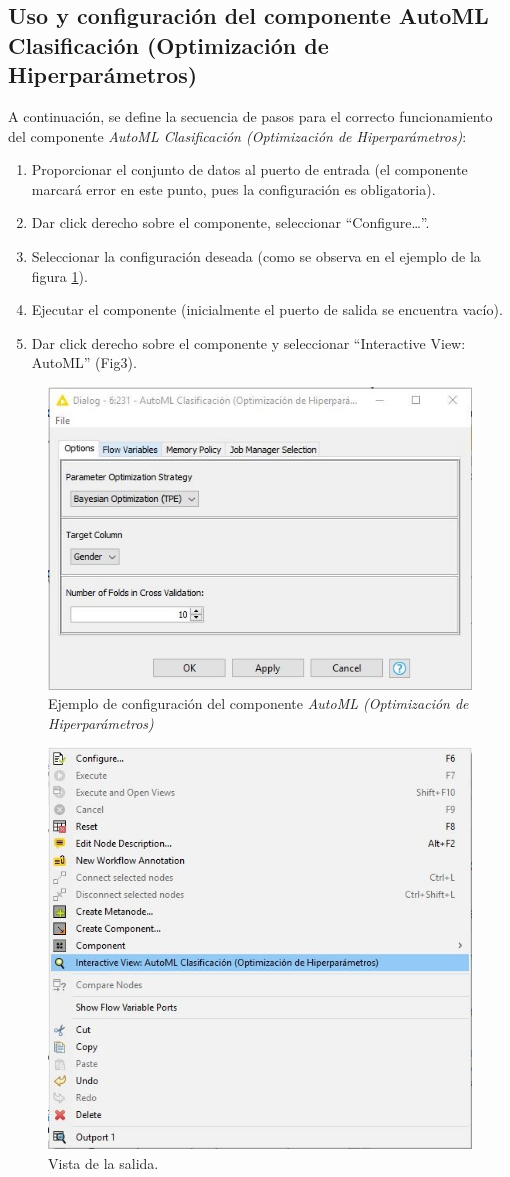 \subsection{Uso y configuración del componente AutoML Clasificación (Optimización de Hiperparámetros)}
A continuación, se define la secuencia de pasos para el correcto funcionamiento del componente \textit{AutoML Clasificación (Optimización de Hiperparámetros)}:

\begin{enumerate}
	\item Proporcionar el conjunto de datos al puerto de entrada (el componente marcará error en este punto, pues la configuración es obligatoria).
	\item Dar click derecho sobre el componente, seleccionar “Configure…”. 
	\item Seleccionar la configuración deseada (como se observa en el ejemplo de la figura \ref{fig:config-automl-hpo}). 
	\item Ejecutar el componente (inicialmente el puerto de salida se encuentra vacío).
	\item Dar click derecho sobre el componente y seleccionar “Interactive View: AutoML” (Fig3). 
\end{enumerate}

\begin{figure}[H]
	\centering
	\includegraphics[width=0.5\linewidth]{"figuras/capi 2/config-automl-hpo"}
	\caption[Ejemplo de configuración del componente AutoML (Optimización de Hiperparámetros)]{Ejemplo de configuración del componente \textit{AutoML (Optimización de Hiperparámetros)}}
	\label{fig:config-automl-hpo}
\end{figure}

\begin{figure}[H]
	\centering
	\includegraphics[width=0.5\linewidth]{"figuras/capi 2/automl-hpo-vista-salida"}
	\caption[Vista de la salida.]{Vista de la salida.}
	\label{fig:automl-hpo-vista-salida}
\end{figure}

